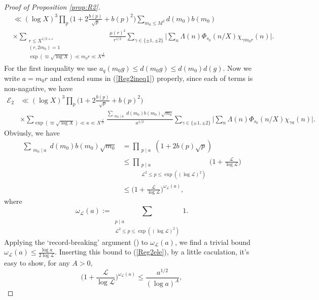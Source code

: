 \documentclass[12pt,reqno]{amsart}
\numberwithin{equation}{section}
\theoremstyle{plain}
\theoremstyle{definition}
\theoremstyle{remark}
\begin{document}
\begin{proof}[Proof of Proposition \ref{prop:R2}]
\begin{align}
&\ll (\log X)^3 \prod_{p} \Big(1+2\frac{b(p)}{\sqrt{p}}+b(p)^2\Big)
\sum_{m_0 \leq M^2} d(m_0)b(m_0)\nonumber\\
&\times \sum_{\substack{r \leq X ^{1 / 2+\varepsilon} \\
(r,2m_0)=1\\
\exp(\varpi \sqrt{\log X}) \ll  m_0r \ll X^{\frac{2}{15}}}} \frac{\mu(r)^2}{r^{1 / 2}} \sum_{\gamma \in\{ \pm 1, \pm 2\}}\Big |\sum_n \Lambda(n) \Phi_{s_0}(n / X) \chi_{\gamma m_0 r}(n)\Big|.
\end{align}
For the first inequality we use $a_q(m_0g)\leq d(m_0g)\leq d(m_0)d(g)$. Now we write $a=m_0r$ and extend sums in (\ref{Reg2ineq1}) properly, since each of terms is non-nagative, we have
\begin{align}\label{Reg2ineq2}
\mathcal{E}_2&\ll
(\log X)^3 \prod_{p} \Big(1+2\frac{b(p)}{\sqrt{p}}+b(p)^2\Big)\nonumber \\
&\times \sum_{\exp(\varpi \sqrt{\log X}) \ll  a \ll X^{\frac{2}{15}}}\frac{\sum_{\substack{m_0\mid a}}d(m_0)b(m_0)\sqrt{m_0}}{a^{1/2}}\sum_{\gamma \in\{ \pm 1, \pm 2\}}\Big |\sum_n \Lambda(n) \Phi_{s_0}(n / X) \chi_{\gamma a}(n)\Big|.
\end{align}
Obviusly, we have
\begin{align}\label{Reg2ele}
\sum_{\substack{m_0\mid a}}d(m_0)b(m_0)\sqrt{m_0}&=\prod_{\substack{p\mid a}}(1+2b(p)\sqrt{p}) \nonumber\\
&\leq\prod_{\substack{p\mid a\\{\mathcal{L}}^2\leq p\leq\exp((\log \mathcal{L})^2)}}\bigg(1+\frac{\mathcal{L}}{\log \mathcal{L}}\bigg) \nonumber\\
&\leq \bigg(1+\frac{\mathcal{L}}{\log \mathcal{L}}\bigg)^{\omega_\mathcal{L}(a)},
\end{align}
where
\begin{equation*}
 \omega_\mathcal{L}(a):=\sum_{\substack{p\mid a\\{\mathcal{L}}^2\leq p\leq\exp((\log \mathcal{L})^2)}} 1.
\end{equation*}
Applying the `record-breaking' argument  (\cite[Theorem 2.9]{MV07}) to $\omega_\mathcal{L}(a)$, we find a trivial bound $\omega_\mathcal{L}(a)\leq \frac{\log a}{2\log \mathcal{L}}$.
Inserting this bound to (\ref{Reg2ele}), by a little caculation, it's easy to show, for any $A>0$,
\begin{equation}\label{Reg2ele2}
\bigg(1+\frac{\mathcal{L}}{\log \mathcal{L}}\bigg)^{\omega_\mathcal{L}(a)}\leq \frac{a^{1/2}}{(\log a)^A},
\end{equation}

\end{proof}
\end{document}
